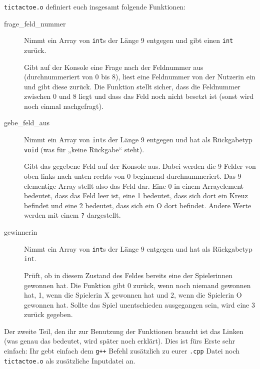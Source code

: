 \texttt{tictactoe.o} definiert euch insgesamt folgende Funktionen:
\begin{description}
    \item[frage\_feld\_nummer]
        Nimmt ein Array von \texttt{int}s der Länge 9 entgegen und gibt einen
        \texttt{int} zurück.

        Gibt auf der Konsole eine Frage nach der Feldnummer aus
        (durchnummeriert von 0 bis 8), liest eine Feldnummer von der Nutzerin
        ein und gibt diese zurück. Die Funktion stellt sicher, dass die
        Feldnummer zwischen 0 und 8 liegt und dass das Feld noch nicht besetzt
        ist (sonst wird noch einmal nachgefragt).
    \item[gebe\_feld\_aus]
        Nimmt ein Array von \texttt{int}s der Länge 9 entgegen und hat als
        Rückgabetyp \texttt{void} (was für „keine Rückgabe“ steht).

        Gibt das gegebene Feld auf der Konsole aus. Dabei werden die 9 Felder
        von oben links nach unten rechts von 0 beginnend durchnummeriert. Das
        9-elementige Array stellt also das Feld dar. Eine 0 in einem
        Arrayelement bedeutet, dass das Feld leer ist, eine 1 bedeutet, dass
        sich dort ein Kreuz befindet und eine 2 bedeutet, dass sich ein O dort
        befindet. Andere Werte werden mit einem \texttt{?} dargestellt.
    \item[gewinnerin]
        Nimmt ein Array von \texttt{int}s der Länge 9 entgegen und hat als
        Rückgabetyp \texttt{int}.

        Prüft, ob in diesem Zustand des Feldes bereits eine der Spielerinnen
        gewonnen hat. Die Funktion gibt 0 zurück, wenn noch niemand gewonnen
        hat, 1, wenn die Spielerin X gewonnen hat und 2, wenn die Spielerin O
        gewonnen hat. Sollte das Spiel unentschieden ausgegangen sein, wird
        eine 3 zurück gegeben.
\end{description}

Der zweite Teil, den ihr zur Benutzung der Funktionen braucht ist das Linken
(was genau das bedeutet, wird später noch erklärt). Dies ist fürs Erste sehr
einfach: Ihr gebt einfach dem \texttt{g++} Befehl zusätzlich zu eurer
\texttt{.cpp} Datei noch \texttt{tictactoe.o} als zusätzliche Inputdatei an.


